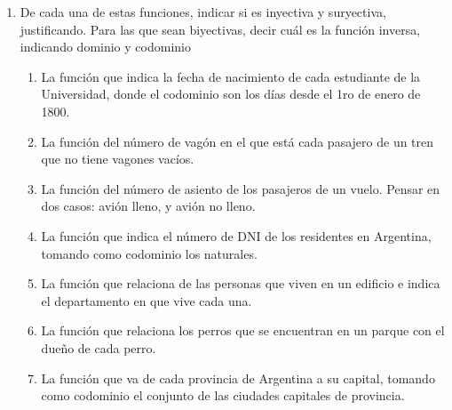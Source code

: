 \documentclass[a4paper]{article}
\newcommand{\exercise}{\item}
\begin{document}
\begin{enumerate}
	\exercise De cada una de estas funciones, indicar si es inyectiva y suryectiva, justificando. Para las que sean biyectivas, decir cuál es la función inversa, indicando dominio y codominio
	\begin{enumerate} [label=(\alph*)]
		\item La función que indica la fecha de nacimiento de cada estudiante de la Universidad, donde el codominio son los días desde el 1ro de enero de 1800.
		\item La función del número de vagón en el que está cada pasajero de un tren que no tiene vagones vacíos.
		\item La función del número de asiento de los pasajeros de un vuelo. Pensar en dos casos: avión lleno, y avión no lleno.
		\item La función que indica el número de DNI de los residentes en Argentina, tomando como codominio los naturales.
		\item La función que relaciona de las personas que viven en un edificio e indica el
		departamento en que vive cada una.
		\item La función que relaciona los perros que se encuentran en un parque con el dueño de cada perro.
		\item La función que va de cada provincia de Argentina a su capital, tomando como
		codominio el conjunto de las ciudades capitales de provincia.
	\end{enumerate}


\end{enumerate}
\end{document}
